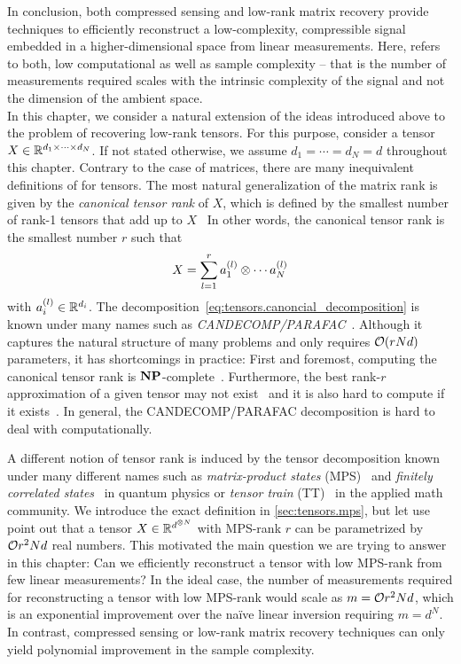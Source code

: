 In conclusion, both compressed sensing and low-rank matrix recovery provide techniques to efficiently reconstruct a low-complexity, compressible signal embedded in a higher-dimensional space from linear measurements.
Here,  refers to both, low computational as well as sample complexity -- that is the number of measurements required scales with the intrinsic complexity of the signal and not the dimension of the ambient space.\\



In this chapter, we consider a natural extension of the ideas introduced above to the problem of recovering low-rank tensors.
For this purpose, consider a tensor $X \in {\mathbb{R}}^{d_1 \times \cdots \times d_N}$.
If not stated otherwise, we assume $d_1 = \cdots = d_N = d$ throughout this chapter.
Contrary to the case of matrices, there are many inequivalent definitions of  for tensors.
The most natural generalization of the matrix rank is given by the \emph{canonical tensor rank} of $X$, which is defined by the smallest number of rank-1 tensors that add up to $X$~\cite{Kolda_2009_Tensor}
In other words, the canonical tensor rank is the smallest number $r$ such that
\[
  X = \sum_{l=1}^r a^{(l)}_1 \otimes \cdots a^{(l)}_N
  \label{eq:tensors.canonical_decomposition}
\]
with $a^{(l)}_i \in {\mathbb{R}}^{d_i}$.
The decomposition~\eqref{eq:tensors.canoncial_decomposition} is known under many names such as \emph{CANDECOMP/PARAFAC}~\cite{Kolda_2009_Tensor}.
Although it captures the natural structure of many problems and only requires ${\mathcal{O}}(r N d)$ parameters, it has shortcomings in practice:
First and foremost, computing the canonical tensor rank is $\mathbf{NP}$-complete~\cite{Hastad_1990_Tensor}.
Furthermore, the best rank-$r$ approximation of a given tensor may not exist~\cite{Kolda_2009_Tensor} and it is also hard to compute if it exists~\cite{Hillar_2013_Most}.
In general, the CANDECOMP/PARAFAC decomposition is hard to deal with computationally.

A different notion of tensor rank is induced by the tensor decomposition known under many different names such as \emph{matrix-product states} (MPS)~\cite{Garcia_2006_Matrix,Verstraete_2008_Matrix,Orus_2014_Practical} and \emph{finitely correlated states}~\cite{Fannes_1992_Finitely} in quantum physics or \emph{tensor train} (TT)~\cite{Oseledets_2011_TensorTrain} in the applied math community.
We introduce the exact definition in \cref{sec:tensors.mps}, but let use point out that a tensor $X \in {\mathbb{R}}^{d^{\otimes N}}$ with MPS-rank $r$ can be parametrized by ${\mathcal{O}}{r^2 N d}$ real numbers.
This motivated the main question we are trying to answer in this chapter:
Can we efficiently reconstruct a tensor with low MPS-rank from few linear measurements?
In the ideal case, the number of measurements required for reconstructing a tensor with low MPS-rank would scale as $m = {\mathcal{O}}{r^2 N d}$, which is an exponential improvement over the naïve linear inversion requiring $m = d^N$.
In contrast, compressed sensing or low-rank matrix recovery techniques can only yield polynomial improvement in the sample complexity.


